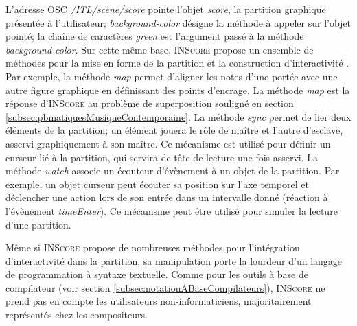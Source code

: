 L'adresse OSC \textit{/ITL/scene/score} pointe l'objet \textit{score}, la partition graphique présentée à l'utilisateur; \textit{background}\textit{-color} désigne la méthode à appeler sur l'objet pointé; la chaîne de caractères \textit{green} est l'argument passé à la méthode \textit{background-color}.
Sur cette même base, \textsc{INScore} propose un ensemble de méthodes pour la mise en forme de la partition et la construction d'interactivité \cite{fober2017}.
Par exemple, la méthode \textit{map} permet d'aligner les notes d'une portée avec une autre figure graphique en définissant des points d'encrage. La méthode \textit{map} est la réponse d'\textsc{INScore} au problème de superposition souligné en section \ref{subsec:pbmatiquesMusiqueContemporaine}.
La méthode \textit{sync} permet de lier deux éléments de la partition; un élément jouera le rôle de maître et l'autre d'esclave, asservi graphiquement à son maître. Ce mécanisme est utilisé pour définir un curseur lié à la partition, qui servira de tête de lecture une fois asservi.
La méthode \textit{watch} associe un écouteur d'évènement à un objet de la partition. Par exemple, un objet curseur peut écouter sa position sur l'axe temporel et déclencher une action lors de son entrée dans un intervalle donné (réaction à l'évènement \textit{timeEnter}). Ce mécanisme peut être utilisé pour simuler la lecture d'une partition.

Même si \textsc{INScore} propose de nombreuses méthodes pour l'intégration d'interactivité dans la partition, sa manipulation porte la lourdeur d'un langage de programmation à syntaxe textuelle. Comme pour les outils à base de compilateur (voir section \ref{subsec:notationABaseCompilateurs}), \textsc{INScore} ne prend pas en compte les utilisateurs non-informaticiens, majoritairement représentés chez les compositeurs.        
